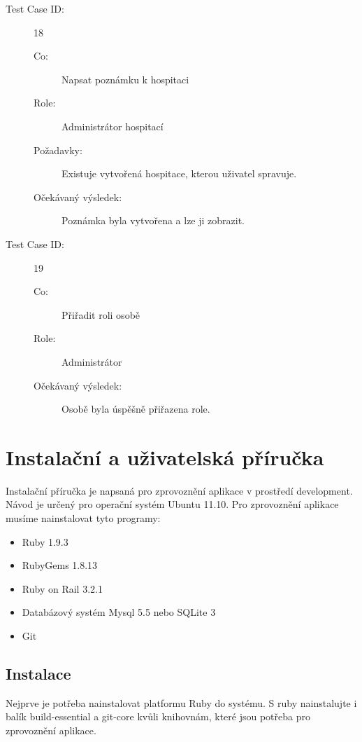 \begin{description}
\item[Test Case ID:] 18
\begin{description}
\item[Co:] Napsat poznámku k hospitaci
\item[Role:] Administrátor hospitací
\item[Požadavky:] Existuje vytvořená hospitace, kterou uživatel spravuje.
\item[Očekávaný výsledek:] Poznámka byla vytvořena a lze ji zobrazit.
\end{description}
\end{description}

\begin{description}
\item[Test Case ID:] 19
\begin{description}
\item[Co:] Přiřadit roli osobě
\item[Role:] Administrátor
\item[Očekávaný výsledek:] Osobě byla úspěšně přiřazena role.
\end{description}
\end{description}


\chapter{Instalační a uživatelská příručka}
Instalační příručka je napsaná pro zprovoznění aplikace v prostředí development. Návod je určený pro operační systém Ubuntu 11.10. Pro zprovoznění aplikace musíme nainstalovat tyto programy:
\begin{itemize}
\item Ruby 1.9.3
\item RubyGems 1.8.13
\item Ruby on Rail 3.2.1
\item Databázový systém Mysql 5.5 nebo SQLite 3
\item Git
\end{itemize}

\section{Instalace}
Nejprve je potřeba nainstalovat platformu Ruby do systému. S ruby nainstalujte i balík build-essential a git-core kvůli  knihovnám, které jsou potřeba pro zprovoznění aplikace. 

